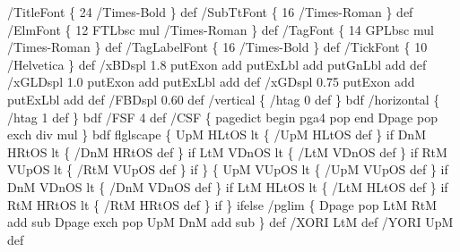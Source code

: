 \documentclass[11pt]{article}
\def\nwendcode{\endtrivlist \endgroup} %
\let\nwdocspar=\par                    %
\begin{document}
\nwenddocs{}\endmoddef
%
/TitleFont    \{ 24 /Times-Bold  \} def
/SubTtFont    \{ 16 /Times-Roman \} def
/ElmFont      \{ 12 FTLbsc mul /Times-Roman \} def
/TagFont      \{ 14 GPLbsc mul /Times-Roman \} def
/TagLabelFont \{ 16 /Times-Bold  \} def
/TickFont     \{ 10 /Helvetica \} def
%
/xBDspl  1.8 putExon add putExLbl add putGnLbl add def %
/xGLDspl 1.0 putExon add putExLbl add def              %
/xGDspl  0.75 putExon add putExLbl add def
/FBDspl 0.60 def %
%
/vertical   \{ /htag 0 def \} bdf
/horizontal \{ /htag 1 def \} bdf
%
/FSF 4 def %
/CSF \{ pagedict begin pga4 pop end Dpage pop exch div mul \} bdf
%
flglscape \{
 UpM HLtOS lt \{ /UpM HLtOS def \} if %
 DnM HRtOS lt \{ /DnM HRtOS def \} if
 LtM VDnOS lt \{ /LtM VDnOS def \} if
 RtM VUpOS lt \{ /RtM VUpOS def \} if
 \} \{
  UpM VUpOS lt \{ /UpM VUpOS def \} if %
  DnM VDnOS lt \{ /DnM VDnOS def \} if
  LtM HLtOS lt \{ /LtM HLtOS def \} if
  RtM HRtOS lt \{ /RtM HRtOS def \} if
  \} ifelse
/pglim \{ Dpage pop LtM RtM add sub Dpage exch pop UpM DnM add sub \} def
/XORI LtM def
/YORI UpM def
%
%
\nwendcode{}\nwdocspar

\end{document}
